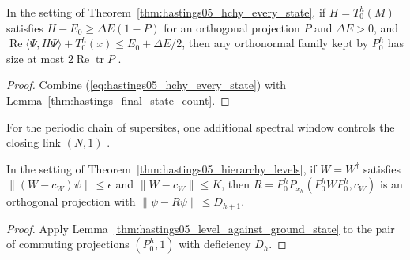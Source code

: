 \begin{theorem}
    \label{thm:hastings05_final_state_count_hierarchy}
    \leanok
    In the setting of Theorem~\ref{thm:hastings05_hchy_every_state}, if
    $H=T_0^h(M)$ satisfies $H-E_0\ge\Delta E(1-P)$ for an orthogonal projection
    $P$ and $\Delta E>0$, and
    $\operatorname{Re}\langle\Psi,H\Psi\rangle+T_0^h(x)\le E_0+\Delta E/2$,
    then any orthonormal family kept by $P_0^h$ has size at most
    $2\operatorname{Re}\operatorname{tr}P$
    \cite[lines 722--730]{Hastings2006Solving}.
\end{theorem}
\begin{proof}\leanok
    Combine (\ref{eq:hastings05_hchy_every_state}) with
    Lemma~\ref{thm:hastings_final_state_count}.
\end{proof}

For the periodic chain of supersites, one additional spectral window controls
the closing link $(N,1)$ \cite{gap:hastings05_hierarchical_energy}.

\begin{lemma}
    \label{thm:hastings05_closing_link_window}
    \leanok
    In the setting of Theorem~\ref{thm:hastings05_hierarchy_levels}, if
    $W=W^\dagger$ satisfies $\|(W-c_W)\psi\|\le\epsilon$ and $\|W-c_W\|\le K$,
    then $R=P_0^hP_{x_h}(P_0^hWP_0^h,c_W)$ is an orthogonal projection with
    $\|\psi-R\psi\|\le D_{h+1}$.
\end{lemma}
\begin{proof}\leanok
    Apply Lemma~\ref{thm:hastings05_level_against_ground_state} to the pair of
    commuting projections $(P_0^h,1)$ with deficiency $D_h$.
\end{proof}

